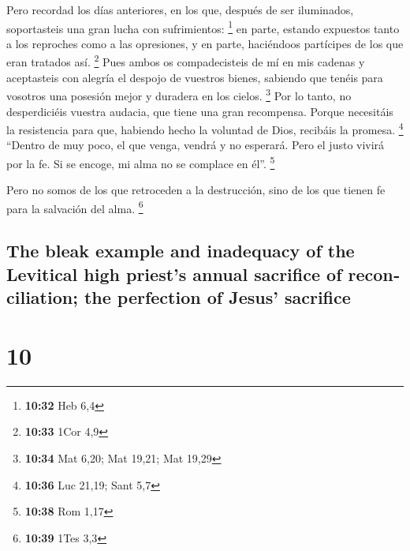\begin{paracol}{2}
 Pero recordad los días anteriores, en los que, después
de ser iluminados, soportasteis una gran lucha con sufrimientos:
\footnote{\textbf{10:32} Heb 6,4}  en parte, estando
expuestos tanto a los reproches como a las opresiones, y en parte,
haciéndoos partícipes de los que eran tratados así. \footnote{\textbf{10:33}
  1Cor 4,9}  Pues ambos os compadecisteis de mí en mis
cadenas y aceptasteis con alegría el despojo de vuestros bienes,
sabiendo que tenéis para vosotros una posesión mejor y duradera en los
cielos. \footnote{\textbf{10:34} Mat 6,20; Mat 19,21; Mat 19,29}
 Por lo tanto, no desperdiciéis vuestra audacia, que
tiene una gran recompensa.  Porque necesitáis la
resistencia para que, habiendo hecho la voluntad de Dios, recibáis la
promesa. \footnote{\textbf{10:36} Luc 21,19; Sant 5,7} 
``Dentro de muy poco, el que venga, vendrá y no esperará.
 Pero el justo vivirá por la fe. Si se encoge, mi alma no
se complace en él''. \footnote{\textbf{10:38} Rom 1,17}

 Pero no somos de los que retroceden a la destrucción,
sino de los que tienen fe para la salvación del alma. \footnote{\textbf{10:39}
  1Tes 3,3}

\switchcolumn
\begin{otherlanguage}{english}

\hypertarget{the-bleak-example-and-inadequacy-of-the-levitical-high-priests-annual-sacrifice-of-reconciliation-the-perfection-of-jesus-sacrifice}{%
\subsection{The bleak example and inadequacy of the Levitical high
priest's annual sacrifice of reconciliation; the perfection of Jesus'
sacrifice}\label{the-bleak-example-and-inadequacy-of-the-levitical-high-priests-annual-sacrifice-of-reconciliation-the-perfection-of-jesus-sacrifice}}

\hypertarget{section-19}{%
\section{10}\label{section-19}}


\end{otherlanguage}
\end{paracol}
